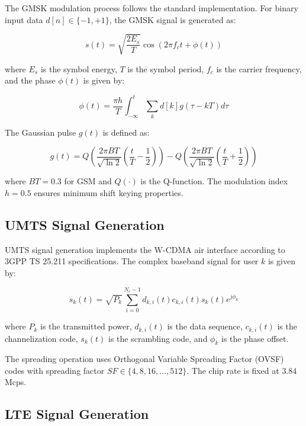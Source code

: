 \documentclass[conference]{IEEEtran}
\begin{document}
The GMSK modulation process follows the standard implementation. For binary input data $d[n] \in \{-1, +1\}$, the GMSK signal is generated as:

\begin{equation}
s(t) = \sqrt{\frac{2E_s}{T}} \cos\left(2\pi f_c t + \phi(t)\right)
\label{eq:gmsk}
\end{equation}

where $E_s$ is the symbol energy, $T$ is the symbol period, $f_c$ is the carrier frequency, and the phase $\phi(t)$ is given by:

\begin{equation}
\phi(t) = \frac{\pi h}{T} \int_{-\infty}^{t} \sum_{k} d[k] g(\tau - kT) d\tau
\label{eq:gmsk_phase}
\end{equation}

The Gaussian pulse $g(t)$ is defined as:

\begin{equation}
g(t) = Q\left(\frac{2\pi BT}{\sqrt{\ln 2}}\left(\frac{t}{T} - \frac{1}{2}\right)\right) - Q\left(\frac{2\pi BT}{\sqrt{\ln 2}}\left(\frac{t}{T} + \frac{1}{2}\right)\right)
\label{eq:gaussian_pulse}
\end{equation}

where $BT = 0.3$ for GSM and $Q(\cdot)$ is the Q-function. The modulation index $h = 0.5$ ensures minimum shift keying properties.

\subsection{UMTS Signal Generation}

UMTS signal generation implements the W-CDMA air interface according to 3GPP TS 25.211 specifications. The complex baseband signal for user $k$ is given by:

\begin{equation}
s_k(t) = \sqrt{P_k} \sum_{i=0}^{N_c-1} d_{k,i}(t) c_{k,i}(t) s_{k}(t) e^{j\phi_k}
\label{eq:umts}
\end{equation}

where $P_k$ is the transmitted power, $d_{k,i}(t)$ is the data sequence, $c_{k,i}(t)$ is the channelization code, $s_k(t)$ is the scrambling code, and $\phi_k$ is the phase offset.

The spreading operation uses Orthogonal Variable Spreading Factor (OVSF) codes with spreading factor $SF \in \{4, 8, 16, ..., 512\}$. The chip rate is fixed at $3.84$ Mcps.

\subsection{LTE Signal Generation}
\end{document}
